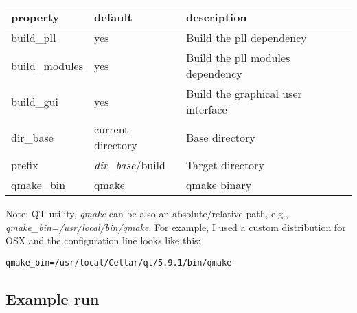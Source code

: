 \begin{tabular}{lll}
  {\bf property} & {\bf default} & {\bf description} \\
  \hline
  build\_pll & yes & Build the pll dependency \\
  build\_modules & yes & Build the pll modules dependency \\
  build\_gui & yes & Build the graphical user interface \\
  dir\_base & current directory & Base directory \\
  prefix & {\em dir\_base}/build & Target directory \\
  qmake\_bin & qmake & qmake binary \\
\end{tabular}
\vspace{1em}

Note: QT utility, {\em qmake} can be also an absolute/relative path, e.g., {\em qmake\_bin=/usr/local/bin/qmake}.
For example, I used a custom distribution for OSX and the configuration line looks like this:

\begin{lstlisting}
qmake_bin=/usr/local/Cellar/qt/5.9.1/bin/qmake
\end{lstlisting}

\subsection{Example run}

